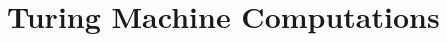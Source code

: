 \documentclass[open-logic-chapter]{subfiles}
\begin{document}
\chapter{Turing Machine Computations}









\OLEndChapterHook
\end{document}
